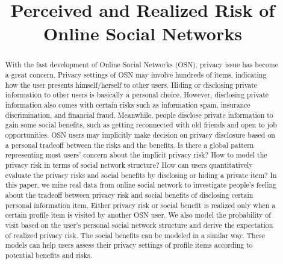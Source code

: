 \documentclass[a4paper]{article}
\begin{document}
\title{Perceived and Realized Risk of Online Social Networks}

\maketitle

\begin{abstract}
With the fast development of Online Social Networks (OSN), privacy
issue has become a great concern. Privacy settings of OSN may involve
hundreds of items, indicating how the user presents himself/herself to
other users. Hiding or disclosing private information to other users
is basically a personal choice. However, disclosing private
information also comes with certain risks such as information spam,
insurance discrimination, and financial fraud. Meanwhile, people
disclose private information to gain some social benefits, such as
getting reconnected with old friends and open to job
opportunities. OSN users may implicitly make decision on privacy
disclosure based on a personal tradeoff between the risks and the
benefits. Is there a global pattern representing most users’ concern
about the implicit privacy risk? How to model the privacy risk in
terms of social network structure? How can users quantitatively
evaluate the privacy risks and social benefits by disclosing or hiding
a private item? In this paper, we mine real data from online social
network to investigate people’s feeling about the tradeoff between
privacy risk and social benefits of disclosing certain personal
information item. Either privacy risk or social benefit is realized
only when a certain profile item is visited by another OSN user. We
also model the probability of visit based on the user’s personal
social network structure and derive the expectation of realized
privacy risk. The social benefits can be modeled in a similar
way. These models can help users assess their privacy settings of
profile items according to potential benefits and risks.

\end{abstract}

\end{document}
